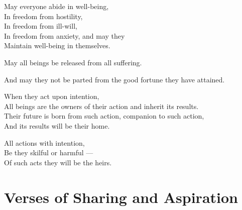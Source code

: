 May everyone abide in well-being,\\
In freedom from hostility,\\
In freedom from ill-will,\\
In freedom from anxiety, and may they\\
Maintain well-being in themselves.

May all beings be released from all suffering.

And may they not be parted from the good fortune they have attained.

When they act upon intention,\\
All beings are the owners of their action and inherit its results.\\
Their future is born from such action, companion to such action,\\
And its results will be their home.

All actions with intention,\\
Be they skilful or harmful ---\\
Of such acts they will be the heirs. 

\section{Verses of Sharing and Aspiration}

\begin{leader}
\end{leader}

\enlargethispage{\baselineskip}


